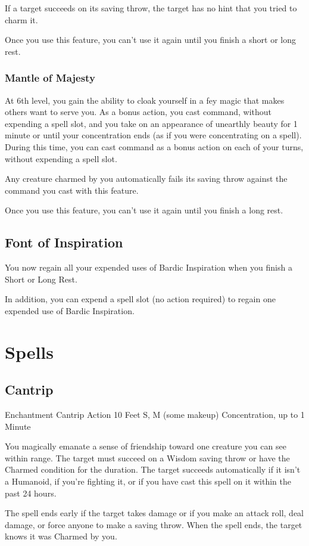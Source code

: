 \documentclass[letterpaper,openany,oneside,twocolumn]{book}
\begin{document}
If a target succeeds on its saving throw, the target has no hint that you tried to charm it.

Once you use this feature, you can't use it again until you finish a short or long rest.
\subsubsection*{Mantle of Majesty}
At 6th level, you gain the ability to cloak yourself in a fey magic that makes others want to serve you. As a bonus action, you cast command, without expending a spell slot, and you take on an appearance of unearthly beauty for 1 minute or until your concentration ends (as if you were concentrating on a spell). During this time, you can cast command as a bonus action on each of your turns, without expending a spell slot.

Any creature charmed by you automatically fails its saving throw against the command you cast with this feature.

Once you use this feature, you can't use it again until you finish a long rest.
\subsection*{Font of Inspiration}
You now regain all your expended uses of Bardic Inspiration when you finish a Short or Long Rest.

In addition, you can expend a spell slot (no action required) to regain one expended use of Bardic Inspiration.

\section*{Spells}
\subsection*{Cantrip}

	{Enchantment Cantrip}
	{Action}
	{10 Feet}
	{S, M (some makeup)}
	{Concentration, up to 1 Minute}

You magically emanate a sense of friendship toward one creature you can see within range. The target must succeed on a Wisdom saving throw or have the Charmed condition for the duration. The target succeeds automatically if it isn't a Humanoid, if you're fighting it, or if you have cast this spell on it within the past 24 hours.

The spell ends early if the target takes damage or if you make an attack roll, deal damage, or force anyone to make a saving throw. When the spell ends, the target knows it was Charmed by you.
\end{document}
